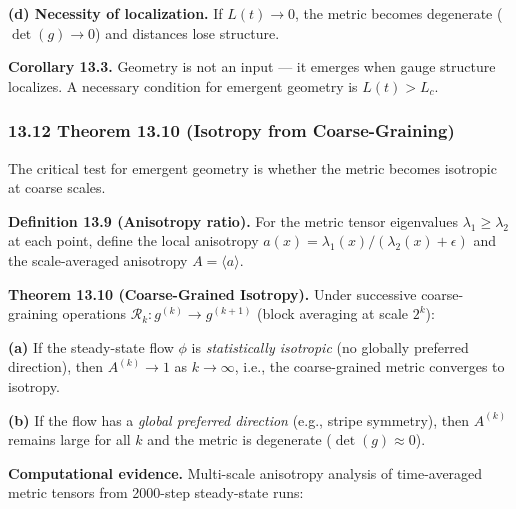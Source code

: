 \documentclass[
]{article}
\begin{document}
\textbf{(d) Necessity of localization.} If \(L(t) \to 0\), the metric
becomes degenerate (\(\det(g) \to 0\)) and distances lose structure.

\textbf{Corollary 13.3.} Geometry is not an input --- it emerges when
gauge structure localizes. A necessary condition for emergent geometry
is \(L(t) > L_c\).

\subsubsection{13.12 Theorem 13.10 (Isotropy from
Coarse-Graining)}\label{theorem-13.10-isotropy-from-coarse-graining}

The critical test for emergent geometry is whether the metric becomes
isotropic at coarse scales.

\textbf{Definition 13.9 (Anisotropy ratio).} For the metric tensor
eigenvalues \(\lambda_1 \geq \lambda_2\) at each point, define the local
anisotropy \(a(x) = \lambda_1(x) / (\lambda_2(x) + \epsilon)\) and the
scale-averaged anisotropy \(A = \langle a \rangle\).

\textbf{Theorem 13.10 (Coarse-Grained Isotropy).} Under successive
coarse-graining operations \(\mathcal{R}_k : g^{(k)} \to g^{(k+1)}\)
(block averaging at scale \(2^k\)):

\textbf{(a)} If the steady-state flow \(\phi\) is \emph{statistically
isotropic} (no globally preferred direction), then \(A^{(k)} \to 1\) as
\(k \to \infty\), i.e., the coarse-grained metric converges to isotropy.

\textbf{(b)} If the flow has a \emph{global preferred direction} (e.g.,
stripe symmetry), then \(A^{(k)}\) remains large for all \(k\) and the
metric is degenerate (\(\det(g) \approx 0\)).

\textbf{Computational evidence.} Multi-scale anisotropy analysis of
time-averaged metric tensors from 2000-step steady-state runs:
\end{document}

